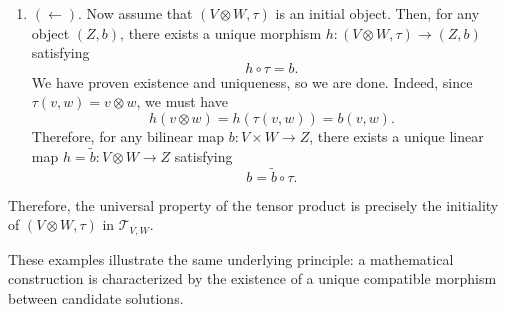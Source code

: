 \begin{example}
\begin{enumerate}
			\item $(\leftarrow)$. Now assume that $(V \otimes W, \tau)$ is an initial object. Then, for any object $(Z, b)$, there exists a unique morphism $h: (V \otimes W, \tau) \to (Z, b)$ satisfying
				\begin{equation}
					h \circ \tau = b.
				\end{equation}
				We have proven existence and uniqueness, so we are done. Indeed, since $\tau(v,w) = v \otimes w$, we must have
				\begin{equation}
					h(v \otimes w) = h(\tau(v,w)) = b(v,w).
				\end{equation}
				Therefore, for any bilinear map $b: V \times W \to Z$, there exists a unique linear map $h = \widetilde{b}: V \otimes W \to Z$ satisfying
				\begin{equation}
					b = \widetilde{b} \circ \tau.
				\end{equation}
		\end{enumerate}
		Therefore, the universal property of the tensor product is precisely the initiality of $(V \otimes W,\tau)$ in $\mathcal{T}_{V,W}$.
	\end{example}

  These examples illustrate the same underlying principle: a mathematical construction is characterized by the existence of a unique compatible morphism between candidate solutions.


